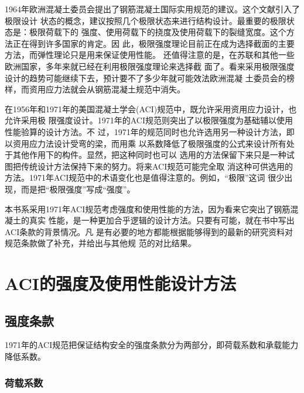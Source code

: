 \documentclass[12pt,a4paper]{book}
\begin{document}
1964年欧洲混凝土委员会提出了钢筋混凝土国际实用规范的建议。这个文献引入了极限设计
状态的概念，建议按照几个极限状态来进行结构设计。最重要的极限状态是：极限荷载下的
强度、使用荷载下的挠度及使用荷载下的裂缝宽度。这个方法正在得到许多国家的肯定。因
此，极限强度理论目前正在成为选择截面的主要方法，而弹性理论只是用来保证使用性能。
还值得注意的是，在苏联和其他一些欧洲国家，多年来就已经在利用极限强度理论来选择截
面了。看来采用极限强度设计的趋势可能继续下去，预计要不了多少年就可能效法欧洲混凝
土委员会的榜样，而资用应力法就会从钢筋混凝土规范中消失。

在1956年和1971年的美国混凝土学会(ACI)规范中，既允许采用资用应力设计，也允许采用极
限强度设计。1971年的ACI规范则突出了以极限强度为基础辅以使用性能验算的设计方法。不
过，1971年的规范同时也允许选用另一种设计方法，即以资用应力法设计受弯的梁，而用乘
以系数降低了极限强度的公式来设计所有处于其他作用下的构件。显然，把这种同时也可以
选用的方法保留下来只是一种试图把传统设计方法保持下来的努力。将来ACI规范可能完全取
消这种可供选用的方法。1971年ACI规范中的术语变化也是值得注意的。例如，“极限”这词
很少出现，而是把“极限强度”写成“强度”。

本书系采用1971年ACI规范考虑强度和使用性能的方法，因为看来它突出了钢筋混凝土的真实
性能，是一种更加合乎逻辑的设计方法。只要有可能，就在书中写出ACI条款的背景情况。凡
是有必要的地方都能根据能够得到的最新的研究资料对规范条款做了补充，并给出与其他规
范的对比结果。

\section{ACI的强度及使用性能设计方法}

\subsection{强度条款}
\label{sec:aci}

1971年的ACI规范把保证结构安全的强度条款分为两部分，即荷载系数和承载能力降低系数。

\subsubsection{荷载系数}
\end{document}
